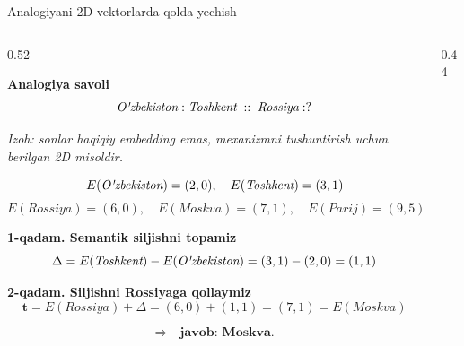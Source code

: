 \documentclass[aspectratio=169,11pt]{beamer}
\begin{document}
\begin{frame}{Analogiyani 2D vektorlarda qo\textquotesingle{}lda yechish}
\scriptsize

\begin{columns}[T,totalwidth=\textwidth]
\begin{column}{0.52\textwidth}

\textbf{Analogiya savoli}
\[
\textit{O\textquotesingle{}zbekiston}:\textit{Toshkent}
\;::\;
\textit{Rossiya}:?
\]

{\scriptsize \textit{Izoh: sonlar haqiqiy embedding emas, mexanizmni
tushuntirish uchun berilgan 2D misoldir.}}

\vspace{2pt}

\begin{tcolorbox}[defbox,left=2mm,right=2mm,top=1mm,bottom=1mm]
\[
E(\textit{O\textquotesingle{}zbekiston})=(2,0),\quad
E(\textit{Toshkent})=(3,1)
\]
\[
E(\textit{Rossiya})=(6,0),\quad
E(\textit{Moskva})=(7,1),\quad
E(\textit{Parij})=(9,5)
\]
\end{tcolorbox}

\vspace{1pt}

\textbf{1-qadam. Semantik siljishni topamiz}
\[
\Delta
=
E(\textit{Toshkent})-E(\textit{O\textquotesingle{}zbekiston})
=
(3,1)-(2,0)
=
(1,1)
\]

\vspace{1pt}

\textbf{2-qadam. Siljishni Rossiyaga qo\textquotesingle{}llaymiz}
\[
\mathbf{t}
=
E(\textit{Rossiya})+\Delta
=
(6,0)+(1,1)
=
(7,1)
=
E(\textit{Moskva})
\]

\[
\Rightarrow\quad \textbf{javob: Moskva.}
\]

\end{column}

\begin{column}{0.44\textwidth}
\centering

\end{column}
\end{columns}
\end{frame}
\end{document}

